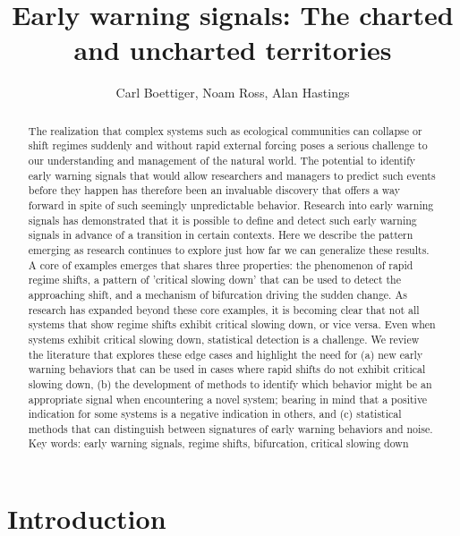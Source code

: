 \documentclass{article}
\title{Early warning signals: The charted and uncharted territories}
\author{Carl Boettiger, Noam Ross, Alan Hastings}
\begin{document}
  

  \begin{abstract}

The realization that complex systems such as ecological communities can collapse or shift regimes suddenly and without rapid external forcing poses a serious challenge to our understanding and management of the natural world.  The potential to identify early warning signals that would allow researchers and managers to predict such events before they happen has therefore been an invaluable discovery that offers a way forward in spite of such seemingly unpredictable behavior.  Research into early warning signals has demonstrated that it is possible to define and detect such early warning signals in advance of a transition in certain contexts.  Here we describe the pattern emerging as research continues to explore just how far we can generalize these results.  A core of examples emerges that shares three properties: the phenomenon of rapid regime shifts,  a pattern of 'critical slowing down' that can be used to detect the approaching shift, and a mechanism of bifurcation driving the sudden change.  As research has expanded beyond these core examples, it is becoming clear that not all systems that show regime shifts exhibit critical slowing down, or vice versa.  Even when systems exhibit critical slowing down, statistical detection is a challenge.  We review the literature that explores these edge cases and highlight the need for (a) new early warning behaviors that can be used in cases where rapid shifts do not exhibit critical slowing down, (b) the development of methods to identify which behavior might be an appropriate signal when encountering a novel system; bearing in mind that a positive indication for some systems is a negative indication in others, and (c) statistical methods that can distinguish between signatures of early warning behaviors and noise.
\\
Key words: early warning signals, regime shifts, bifurcation, critical slowing down 
\\
\end{abstract}


\section{Introduction}
\end{document}
